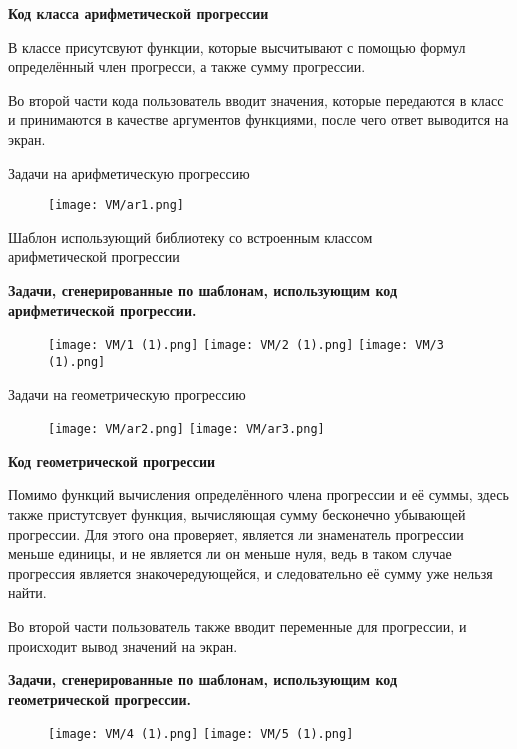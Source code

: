 \textbf{Код класса арифметической прогрессии}



В классе присутсвуют функции, которые высчитывают с помощью формул определённый член прогресси, а также сумму прогрессии. 

Во второй части кода пользователь вводит значения, которые передаются в класс и принимаются в качестве аргументов функциями, после чего ответ выводится на экран.

Задачи на арифметическую прогрессию

\begin{figure}[h]
	\centering
	\texttt{[image: VM/ar1.png]}
	\end{figure}
	
Шаблон использующий библиотеку со встроенным классом
\\ арифметической прогрессии



\textbf{Задачи, сгенерированные по шаблонам, использующим код
\\арифметической прогрессии.}
	\begin{figure}[h]
		\centering
		\texttt{[image: VM/1 (1).png]}
		\texttt{[image: VM/2 (1).png]}
		\texttt{[image: VM/3 (1).png]}
	\end{figure}


Задачи на геометрическую прогрессию

\begin{figure}[h]
	\centering
	\texttt{[image: VM/ar2.png]}
	\texttt{[image: VM/ar3.png]}
	\end{figure}

\textbf{Код геометрической прогрессии}



Помимо функций вычисления определённого члена прогрессии и её суммы, здесь также пристутсвует функция, вычисляющая сумму бесконечно убывающей прогрессии. Для этого она проверяет, является ли знаменатель прогрессии меньше единицы, и не является ли он меньше нуля, ведь в таком случае прогрессия является знакочередующейся, и следовательно её сумму уже нельзя найти.

 Во второй части пользователь также вводит переменные для прогрессии, и происходит вывод значений на экран.

\textbf{Задачи, сгенерированные по шаблонам, использующим код 
\\геометрической прогрессии.}

	\begin{figure}[h]
		\centering
		\texttt{[image: VM/4 (1).png]}
		\texttt{[image: VM/5 (1).png]}
	\end{figure}
	
